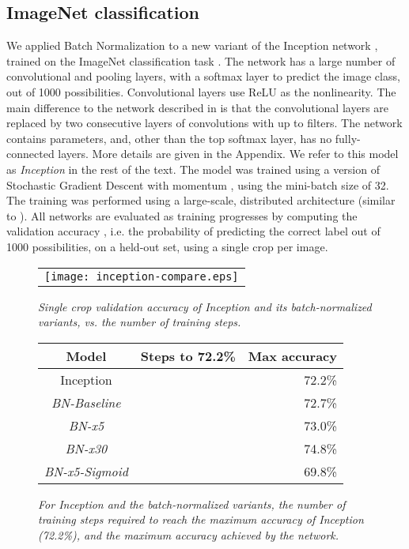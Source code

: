 \documentclass[twocolumn]{article}
\begin{document}
\subsection{ImageNet classification}
\label{sec-results}

We applied Batch Normalization to a new variant of the Inception network \cite{inception},
trained on the ImageNet classification task \cite{imagenet}. The network has a large
number of convolutional and pooling layers, with a softmax layer to predict the
image class, out of 1000 possibilities. Convolutional layers use ReLU as the
nonlinearity. The main difference to the network described in \cite{inception} is that
the  convolutional layers are replaced by two consecutive layers of  convolutions
with up to  filters. The network contains  parameters, and, other than the top softmax layer, has no fully-connected layers.  More details are given in the Appendix.  We refer to this model as {\sl Inception} in the rest of the text. The model was trained using a version of Stochastic Gradient Descent with momentum
\cite{momentum}, using the mini-batch size of 32. The training was performed using a large-scale, distributed architecture (similar to \cite{dist-belief}).
All networks are evaluated as training progresses by computing the validation accuracy , i.e. the
probability of predicting the correct label out of 1000 possibilities, on a held-out set, using a single crop per image.

\begin{figure*}
\centering
\begin{minipage}[b]{\columnwidth}
\begin{tabular}{@{}c@{}}
\texttt{[image: inception-compare.eps]}
\end{tabular} 
\caption{\em Single crop validation accuracy of Inception and its
  batch-normalized variants, vs. the number of training steps.  }
\label{fig-inception}
\end{minipage}
\qquad
\begin{minipage}[b]{0.9\columnwidth}
\begin{tabular}{@{} c | r  r  @{}}
\hline
Model & Steps to  72.2\% & Max accuracy \\ 
\hline
Inception&  & 72.2\%  \\
\sl BN-Baseline&  & 72.7\%  \\
\sl BN-x5&  & 73.0\%  \\
\sl BN-x30&  & 74.8\% \\
\sl BN-x5-Sigmoid&  & 69.8\%\\\hline
\end{tabular}
\caption{\em For Inception and the batch-normalized variants, the number of training steps required to reach the maximum accuracy of Inception (72.2\%), and the maximum accuracy achieved by the network.}
\label{fig-stats}
\end{minipage}
\end{figure*}
\end{document}
